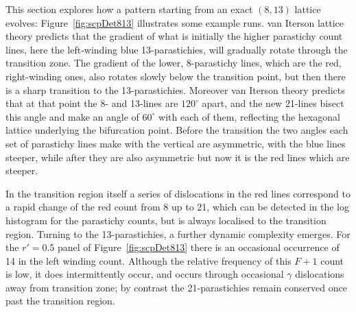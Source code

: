 This section explores how a pattern starting from an exact $(8,13)$ lattice evolves: Figure~\ref{fig:scpDet813} illustrates some example runs.
%
 van Iterson lattice theory predicts that the gradient of what is initially the higher parastichy count lines, here the left-winding blue 13-parastichies, will gradually rotate through the transition zone. The gradient of the lower, 8-parastichy lines, which are the red, right-winding ones, also rotates slowly below the transition point, but then there is a sharp transition to the 13-parastichies. Moreover  van Iterson theory predicts that at that point the 8- and 13-lines are $120^{\circ}$ apart, and the new 21-lines bisect this angle and make an angle of $60^\circ$ with each of them, reflecting the hexagonal lattice underlying the bifurcation point. Before the transition the two angles each set of parastichy lines make with the vertical are asymmetric, with the blue lines steeper, while after they are also asymmetric but now it is the red lines which are steeper.
 
  In the transition region itself a series of dislocations in the red lines correspond to a rapid change of the red count from 8 up to 21, which can be detected in the 
 log histogram for the parastichy counts, but is always localised to the transition region. Turning to the 13-parastichies,  a further dynamic complexity emerges.
 For the  $r'=0.5$ panel of  Figure~\ref{fig:scpDet813} there is an occasional occurrence of 14 in the left winding count. Although the relative frequency of this $F+1$ count is low, it does intermittently occur, and occurs through occasional $\gamma$ dislocations away from  transition zone; by contrast the 21-parastichies remain conserved once past the transition region. 
 
